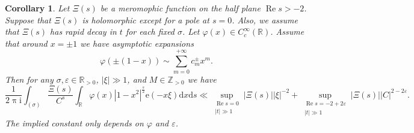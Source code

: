 \documentclass[10pt,oneside,reqno]{amsart}
\newcommand\rmd{\mathrm{d}}
\newcommand\rme{\mathrm{e}}
\newcommand\rmi{\mathrm{i}}
\newcommand\RR{\mathbb{R}}
\newcommand\ZZ{\mathbb{Z}}
\newcommand\dpii{2\uppi\rmi}
\renewcommand\Re{\mathop{\mathrm{Re}}}
\theoremstyle{THEOREM}
\newtheorem{corollary}[theorem]{Corollary}
\theoremstyle{DEFINITION}
\theoremstyle{EXERCISE}
\numberwithin{equation}{section}
\begin{document}
\begin{corollary}\label{cor:mainarchimedeancor}
Let $\Xi(s)$ be a meromophic function on the half plane $\Re s>-2$. Suppose that $\Xi(s)$ is holomorphic except for a pole at $s=0$. Also, we assume that $\Xi(s)$ has rapid decay in $t$ for each fixed $\sigma$. Let $\varphi(x)\in C_c^\infty(\RR)$. Assume that around $x=\pm 1$ we have asymptotic expansions
\[
\varphi(\pm(1-x))\sim \sum_{m=0}^{+\infty}c_m^\pm x^m.
\]
Then for any $\sigma,\varepsilon\in \RR_{>0}$, $|\xi|\gg 1$, and $M\in \ZZ_{>0}$ we have
\[
\frac{1}{\dpii}\int_{(\sigma)}\frac{\Xi(s)}{C^s}\int_{\RR}\varphi(x)|1-x^2|^{\frac s2} \rme(-x\xi)\rmd x\rmd s\ll \sup_{\substack{\Re s=0 \\ |t|\gg 1}}|\Xi(s)||\xi|^{-2}+\sup_{\substack{\Re s=-2+2\varepsilon \\ |t|\gg 1}}|\Xi(s)||C|^{2-2\varepsilon}.
\]
The implied constant only depends on $\varphi$ and $\varepsilon$.
\end{corollary}
\end{document}
